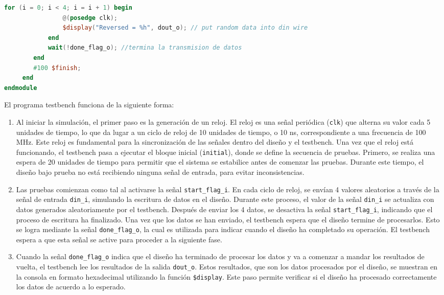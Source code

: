 \begin{adjustwidth}{1.5cm}{}
\begin{lstlisting}[language=verilog,frame=single,caption={Código fuente del testtbench para simular en Vivado},showstringspaces=false,label=lst:testbenchVivado]
            for (i = 0; i < 4; i = i + 1) begin
                @(posedge clk);
                $display("Reversed = %h", dout_o); // put random data into din wire
            end
            wait(!done_flag_o); //termina la transmision de datos
        end
        #100 $finish;
     end
endmodule
\end{lstlisting}

El programa testbench funciona de la siguiente forma: 

\begin{enumerate}
    \item Al iniciar la simulación, el primer paso es la generación de un reloj. El reloj es una señal periódica (\texttt{clk}) que alterna su valor cada 5 unidades de tiempo, lo que da lugar a un ciclo de reloj de 10 unidades de tiempo, o 10 ns, correspondiente a una frecuencia de 100 MHz. Este reloj es fundamental para la sincronización de las señales dentro del diseño y el testbench. Una vez que el reloj está funcionando, el testbench pasa a ejecutar el bloque inicial (\texttt{initial}), donde se define la secuencia de pruebas. Primero, se realiza una espera de 20 unidades de tiempo para permitir que el sistema se estabilice antes de comenzar las pruebas. Durante este tiempo, el diseño bajo prueba no está recibiendo ninguna señal de entrada, para evitar inconsistencias.

    \item Las pruebas comienzan como tal al activarse  la señal \texttt{start\_flag\_i}. En cada ciclo de reloj, se envían 4 valores aleatorios a través de la señal de entrada \texttt{din\_i}, simulando la escritura de datos en el diseño. Durante este proceso, el valor de la señal \texttt{din\_i} se actualiza con datos generados aleatoriamente por el testbench. Después de enviar los 4 datos, se desactiva la señal \texttt{start\_flag\_i}, indicando que el proceso de escritura ha finalizado. Una vez que los datos se han enviado, el testbench espera que el diseño termine de procesarlos. Esto se logra mediante la señal \texttt{done\_flag\_o}, la cual es utilizada para indicar cuando el diseño ha completado su operación. El testbench espera a que esta señal se active para proceder a la siguiente fase.

    \item Cuando la señal \texttt{done\_flag\_o} indica que el diseño ha terminado de procesar los datos y va a comenzar a mandar los resultados de vuelta, el testbench lee los resultados de la salida \texttt{dout\_o}. Estos resultados, que son los datos procesados por el diseño, se muestran en la consola en formato hexadecimal utilizando la función \texttt{\$display}. Este paso permite verificar si el diseño ha procesado correctamente los datos de acuerdo a lo esperado.


\end{enumerate}
\end{adjustwidth}
